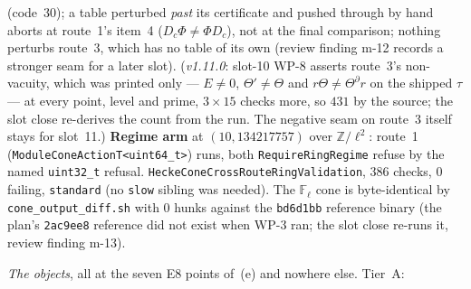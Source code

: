 \documentclass[11pt]{article}
\theoremstyle{remark}
\newcommand{\F}{\mathbb{F}}
\newcommand{\Z}{\mathbb{Z}}
\newcommand{\Fl}{\F_\ell}
\begin{document}
\begin{itemize}
\begin{itemize}
    (code~30); a table perturbed \emph{past} its certificate and pushed through by hand aborts at
    route~1's item~4 ($D_c\Phi\ne\Phi D_c$), not at the final comparison; nothing perturbs route~3,
    which has no table of its own (review finding m-12 records a stronger seam for a later slot).
    (\emph{v1.11.0}: slot-10 WP-8 asserts route~3's non-vacuity, which was printed only ---
    $E\ne0$, $\Theta'\ne\Theta$ and $r\Theta\ne\Theta^{\partial}r$ on the shipped $\tau$ --- at every
    point, level and prime, $3\times15$ checks more, so $431$ by the source; the slot close
    re-derives the count from the run. The negative seam on route~3 itself stays for slot~11.)
    \textbf{Regime arm} at $(10,134217757)$ over $\Z/\ell^2$: route~1
    (\texttt{ModuleConeActionT<uint64\_t>}) runs, both \texttt{RequireRingRegime} refuse by the
    named \texttt{uint32\_t} refusal. \texttt{HeckeConeCrossRouteRingValidation}, $386$ checks,
    $0$ failing, \texttt{standard} (no \texttt{slow} sibling was needed). The $\Fl$ cone is
    byte-identical by \texttt{cone\_output\_diff.sh} with $0$ hunks against the \texttt{bd6d1bb}
    reference binary (the plan's \texttt{2ac9ee8} reference did not exist when WP-3 ran; the slot
    close re-runs it, review finding m-13).
  \end{itemize}
\end{itemize}
\emph{The objects}, all at the seven E8 points of~(e) and nowhere else. Tier~A:
\end{document}
